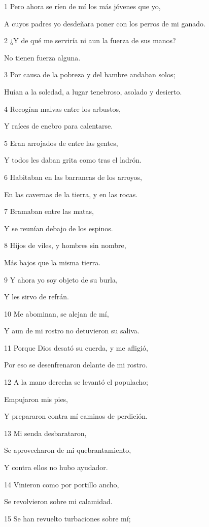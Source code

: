 \par 1 Pero ahora se ríen de mí los más jóvenes que yo,
\par A cuyos padres yo desdeñara poner con los perros de mi ganado.
\par 2 ¿Y de qué me serviría ni aun la fuerza de sus manos?
\par No tienen fuerza alguna.
\par 3 Por causa de la pobreza y del hambre andaban solos;
\par Huían a la soledad, a lugar tenebroso, asolado y desierto.
\par 4 Recogían malvas entre los arbustos,
\par Y raíces de enebro para calentarse.
\par 5 Eran arrojados de entre las gentes,
\par Y todos les daban grita como tras el ladrón.
\par 6 Habitaban en las barrancas de los arroyos,
\par En las cavernas de la tierra, y en las rocas.
\par 7 Bramaban entre las matas,
\par Y se reunían debajo de los espinos.
\par 8 Hijos de viles, y hombres sin nombre,
\par Más bajos que la misma tierra.
\par 9 Y ahora yo soy objeto de su burla,
\par Y les sirvo de refrán.
\par 10 Me abominan, se alejan de mí,
\par Y aun de mi rostro no detuvieron su saliva.
\par 11 Porque Dios desató su cuerda, y me afligió, 
\par Por eso se desenfrenaron delante de mi rostro.
\par 12 A la mano derecha se levantó el populacho;
\par Empujaron mis pies,
\par Y prepararon contra mí caminos de perdición.
\par 13 Mi senda desbarataron,
\par Se aprovecharon de mi quebrantamiento,
\par Y contra ellos no hubo ayudador.
\par 14 Vinieron como por portillo ancho,
\par Se revolvieron sobre mi calamidad.
\par 15 Se han revuelto turbaciones sobre mí;
